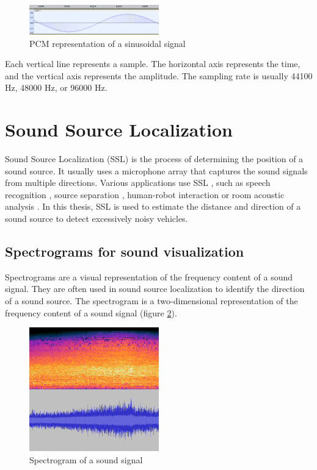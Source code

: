 \begin{figure}[H]
    \centering
    \includegraphics[width=0.5\textwidth]{../Images/sine_wave_representation_audacity.png}
    \caption{PCM representation of a sinusoidal signal}
    \label{fig:sine_wave_representation_audacity}
\end{figure}

Each vertical line represents a sample. The horizontal axis represents the time, and the vertical axis represents the amplitude. The sampling rate is usually 44100 Hz, 48000 Hz, or 96000 Hz.

\section{Sound Source Localization}

Sound Source Localization (SSL) is the process of determining the position of a sound source. It usually uses a microphone array that captures the sound signals from multiple directions. Various applications use SSL \cite{Grumiaux_2022}, such as speech recognition \cite{7952261}, source separation \cite{8903121}, human-robot interaction \cite{Li_2016} or room acoustic analysis \cite{amengual}. In this thesis, SSL is used to estimate the distance and direction of a sound source to detect excessively noisy vehicles.

\subsection{Spectrograms for sound visualization}
\label{subsec:spectrograms}

Spectrograms are a visual representation of the frequency content of a sound signal. They are often used in sound source localization to identify the direction of a sound source. The spectrogram is a two-dimensional representation of the frequency content of a sound signal (figure \ref*{fig:spectrogram_example}).

\begin{figure}[H]
    \centering
    \includegraphics[width=0.5\textwidth]{../Images/spectrogram-example.png}
    \caption{Spectrogram of a sound signal}
    \label{fig:spectrogram_example}
\end{figure}


